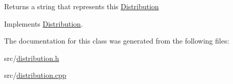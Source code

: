 \begin{DoxyReturn}{Returns}
a string that represents this \mbox{\hyperlink{class_distribution}{Distribution}} 
\end{DoxyReturn}


Implements \mbox{\hyperlink{class_distribution_ac41d57a4d7f82041810f886590a236a5}{Distribution}}.



The documentation for this class was generated from the following files\+:\begin{DoxyCompactItemize}
\item 
src/\mbox{\hyperlink{distribution_8h}{distribution.\+h}}\item 
src/\mbox{\hyperlink{distribution_8cpp}{distribution.\+cpp}}\end{DoxyCompactItemize}
